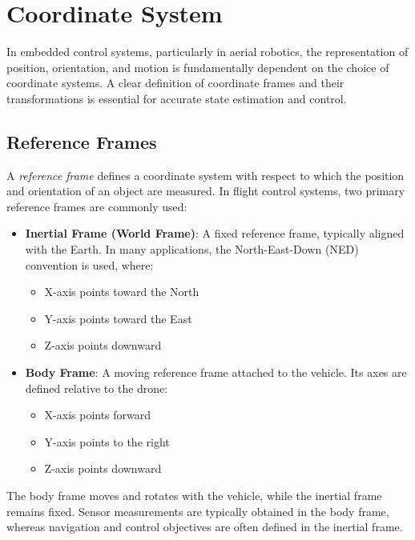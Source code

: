 \section{Coordinate System}
\label{sec:coordinate}

In embedded control systems, particularly in aerial robotics, the representation of position, orientation, and motion is fundamentally dependent on the choice of coordinate systems. A clear definition of coordinate frames and their transformations is essential for accurate state estimation and control.

\subsection{Reference Frames}

A \textit{reference frame} defines a coordinate system with respect to which the position and orientation of an object are measured. In flight control systems, two primary reference frames are commonly used:

\begin{itemize}
    \item \textbf{Inertial Frame (World Frame)}:  
    A fixed reference frame, typically aligned with the Earth. In many applications, the North-East-Down (NED) convention is used, where:
    \begin{itemize}
        \item X-axis points toward the North
        \item Y-axis points toward the East
        \item Z-axis points downward
    \end{itemize}
    
    \item \textbf{Body Frame}:  
    A moving reference frame attached to the vehicle. Its axes are defined relative to the drone:
    \begin{itemize}
        \item X-axis points forward
        \item Y-axis points to the right
        \item Z-axis points downward
    \end{itemize}
\end{itemize}

The body frame moves and rotates with the vehicle, while the inertial frame remains fixed. Sensor measurements are typically obtained in the body frame, whereas navigation and control objectives are often defined in the inertial frame.

